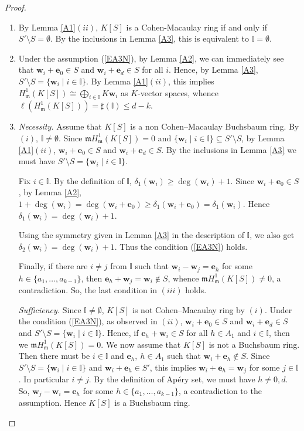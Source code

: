 \documentclass[11pt]{article}
\def\deg{\operatorname{deg}}
\def\mfr{{\frak m}}
\def\ebf{{\mathbf e}}
\def\wbf{{\mathbf w}}
\def\mfr{{\mathfrak m}}
\def\Iset{{\mathbb I}}
\theoremstyle{remark}
\theoremstyle{definition}
\begin{document}
\begin{proof} 
\begin{enumerate}[\((i)\)]
    \item By Lemma \ref{A1}\((ii)\), $K[S]$ is a Cohen-Macaulay ring if and only if $S'\setminus S= \emptyset$. By the  inclusions in Lemma \ref{A3},  this is equivalent to $\Iset = \emptyset$.
    \item Under the assumption (\ref{EA3N}), by Lemma \ref{A2}, we can immediately see that $\wbf_i + \ebf_0\in S$ and $\wbf_i + \ebf_d \in S$ for all $i$. Hence, by Lemma \ref{A3}, $S' \setminus S= \{\wbf_i\mid i \in \Iset\}$. By Lemma \ref{A1}\((ii)\), this implies $H^1_\mfr(K[S])\cong \bigoplus_{i\in \Iset}K\wbf_i$ as $K$-vector spaces, whence   $\ell ( H^1_\mfr(K[S])) = \sharp(\Iset) \leq d- k$.
    \item \textit{Necessity.} Assume that $K[S]$ is a non Cohen--Macaulay Buchsbaum ring. By \((i)\), $\Iset \neq \emptyset$. Since $\mfr H^1_\mfr(K[S]) = 0$ and $ \{\wbf_i\mid i \in \Iset\} \subseteq S'\setminus S$, by Lemma \ref{A1}\((ii)\), $\wbf_i + \ebf_0 \in S$ and $\wbf_i + \ebf_d \in S$.  By the inclusions in Lemma \ref{A3} we must have
$S'\setminus S =  \{\wbf_i\mid i \in \Iset\}$. 

Fix $i \in \Iset$. By the definition of $\Iset$, $\delta_1(\wbf_i) \geq \deg(\wbf_i) + 1$. Since $\wbf_i + \ebf_0 \in S$, by Lemma \ref{A2}, $ 1+ \deg(\wbf_i) =  \deg(\wbf_i + \ebf_0) \geq \delta_1( \wbf_i + \ebf_0) = \delta_1( \wbf_i)$. Hence $\delta_1(\wbf_i) =  \deg(\wbf_i) + 1$.

Using the symmetry given in Lemma \ref{A3} in the description of $\Iset$, we also get $\delta_2(\wbf_i) = \deg(\wbf_i) + 1$.  Thus the condition (\ref{EA3N}) holds.

Finally, if there are $i\neq j$ from $\Iset$ such that $\wbf_i-\wbf_j =\ebf_h$ for some $h \in \{a_1,\ldots,a_{k-1} \}$, then $\ebf_h + \wbf_j = \wbf_i \not\in S$, whence $\mfr H^1_{\mfr}(K[S]) \neq 0$, a contradiction. So, the last condition in \((iii)\) holds.

\textit{Sufficiency.} Since $\mathbb{I}\neq\emptyset$, $K[S]$ is not Cohen--Macaulay ring by \((i)\). Under the condition (\ref{EA3N}),  as observed in \((ii)\), $\wbf_i + \ebf_0\in S$ and $\wbf_i + \ebf_d \in S$ and $S'\setminus S = \{\wbf_i\mid i \in \Iset\}$. Hence,  if $\ebf_h + \wbf_i \in S$ for all $h\in A_1$ and $i\in \Iset$, then we $\mfr H^1_{\mfr}(K[S]) = 0$. We now assume that $K[S]$ is not a Buchsbaum ring. Then there must be $i\in \Iset$ and $\ebf_h,\ h\in A_1$ such that $\wbf_i + \ebf_h \not\in S$. Since $S'\setminus S = \{\wbf_i\mid i \in \Iset\}$ and $\wbf_i + \ebf_h \in S'$,  this implies $\wbf_i + \ebf_h =\wbf_j$ for some $j\in \Iset$. In particular $i\neq j$. By the definition of Ap\'ery set, we must have $h\neq 0, d$. So, $\wbf_j - \wbf_i = \ebf_h$ for some  $h\in \{ a_1,\ldots,a_{k-1}\}$, a contradiction to the assumption. Hence $K[S]$ is  a Buchsbaum ring.
\end{enumerate}
\end{proof}
\end{document}
